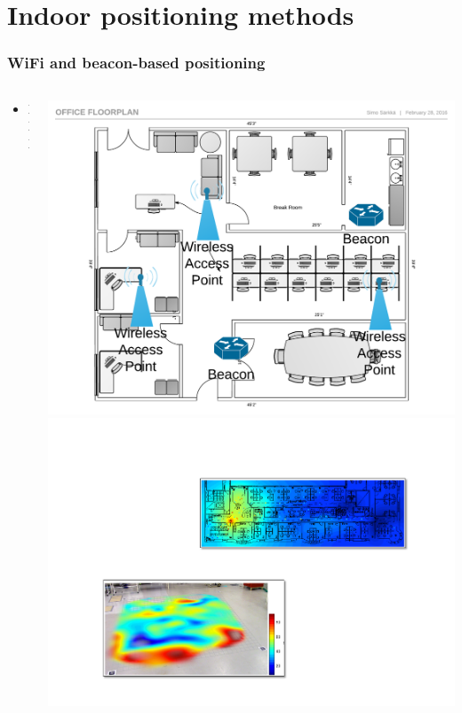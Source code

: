 \documentclass[xcolor=svgnames,english,handout]{beamer}
\begin{document}
\section{Indoor positioning methods}

\begin{frame}
  \frametitle{WiFi and beacon-based positioning}

  \begin{columns}
  \begin{column}{0.6\textwidth}
  \begin{itemize}[<+->]       
  \item XXX
  \end{itemize}
  \end{column}
  \begin{column}{0.4\textwidth}
  \includegraphics[width=\columnwidth]{floorplan} \\
  \includegraphics[width=\columnwidth]{wifimap}
  \end{column}
  \end{columns}
\end{frame}
\end{document}
